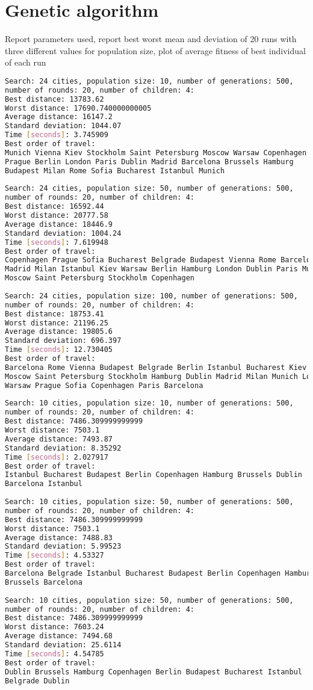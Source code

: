 \documentclass{article}
\begin{document}
\section{Genetic algorithm}
Report parameters used, report best worst mean and deviation of 20 runs with three different values for population size, plot of average fitness of best individual of each run
\begin{lstlisting}[language=bash]
Search: 24 cities, population size: 10, number of generations: 500, 
number of rounds: 20, number of children: 4: 
Best distance: 13783.62
Worst distance: 17690.740000000005
Average distance: 16147.2
Standard deviation: 1044.07
Time [seconds]: 3.745909
Best order of travel: 
Munich Vienna Kiev Stockholm Saint Petersburg Moscow Warsaw Copenhagen 
Prague Berlin London Paris Dublin Madrid Barcelona Brussels Hamburg 
Budapest Milan Rome Sofia Bucharest Istanbul Munich
 
Search: 24 cities, population size: 50, number of generations: 500, 
number of rounds: 20, number of children: 4: 
Best distance: 16592.44
Worst distance: 20777.58
Average distance: 18446.9
Standard deviation: 1004.24
Time [seconds]: 7.619948
Best order of travel: 
Copenhagen Prague Sofia Bucharest Belgrade Budapest Vienna Rome Barcelona 
Madrid Milan Istanbul Kiev Warsaw Berlin Hamburg London Dublin Paris Munich 
Moscow Saint Petersburg Stockholm Copenhagen
 
Search: 24 cities, population size: 100, number of generations: 500, 
number of rounds: 20, number of children: 4: 
Best distance: 18753.41
Worst distance: 21196.25
Average distance: 19805.6
Standard deviation: 696.397
Time [seconds]: 12.730405
Best order of travel: 
Barcelona Rome Vienna Budapest Belgrade Berlin Istanbul Bucharest Kiev 
Moscow Saint Petersburg Stockholm Hamburg Dublin Madrid Milan Munich London 
Warsaw Prague Sofia Copenhagen Paris Barcelona
 
Search: 10 cities, population size: 10, number of generations: 500, 
number of rounds: 20, number of children: 4: 
Best distance: 7486.309999999999
Worst distance: 7503.1
Average distance: 7493.87
Standard deviation: 8.35292
Time [seconds]: 2.027917
Best order of travel: 
Istanbul Bucharest Budapest Berlin Copenhagen Hamburg Brussels Dublin 
Barcelona Istanbul
 
Search: 10 cities, population size: 50, number of generations: 500, 
number of rounds: 20, number of children: 4: 
Best distance: 7486.309999999999
Worst distance: 7503.1
Average distance: 7488.83
Standard deviation: 5.99523
Time [seconds]: 4.53327
Best order of travel: 
Barcelona Belgrade Istanbul Bucharest Budapest Berlin Copenhagen Hamburg 
Brussels Barcelona
 
Search: 10 cities, population size: 50, number of generations: 500, 
number of rounds: 20, number of children: 4: 
Best distance: 7486.309999999999
Worst distance: 7603.24
Average distance: 7494.68
Standard deviation: 25.6114
Time [seconds]: 4.54785
Best order of travel: 
Dublin Brussels Hamburg Copenhagen Berlin Budapest Bucharest Istanbul 
Belgrade Dublin
\end{lstlisting}
\end{document}
